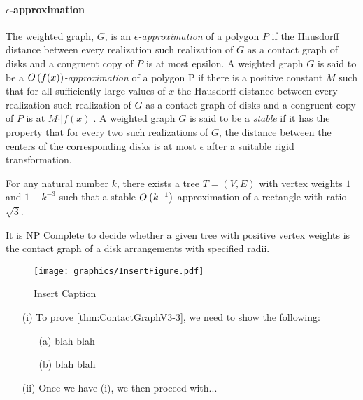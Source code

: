 \paragraph{$\epsilon$-approximation}
The weighted graph, $G$, is an \textit{$\epsilon$-approximation} of a polygon $P$ if the Hausdorff distance between every realization such realization of $G$ as a contact graph of disks and a congruent copy of $P$ is at most epsilon.  A weighted graph $G$ is said to be a \textit{$O\left( f(x) \right)$-approximation} of a polygon P if there is a positive constant $M$ such that for all sufficiently large values of $x$ the Hausdorff distance between every realization such realization of $G$ as a contact graph of disks and a congruent copy of $P$ is at $M \cdot \vert f(x)\vert$. A weighted graph $G$ is said to be a \textit{stable} if it has the property that for every two such realizations of $G$, the distance between the centers of the corresponding disks is at most $\epsilon$ after a suitable rigid transformation.  





\begin{lem}\label{lem:ContactGraphV3-1}
For any natural number $k$,  there exists a tree $T = (V,E)$ with vertex weights $1$ and $1 - k^{-3}$ such that a stable $O\left( k^{-1} \right)$-approximation of a rectangle with ratio $\sqrt{3}$.
\end{lem}
\begin{thm}\label{thm:ContactGraphV3-3}
It is NP Complete to decide whether a given tree with positive vertex weights is the contact graph of a disk arrangements with specified radii.
\end{thm}

\begin{figure}[!htbp]
\begin{center}
\texttt{[image: graphics/InsertFigure.pdf]}
\caption{Insert Caption}\label{fig:insertSomething}
\end{center}
\end{figure}

\begin{pf}
\begin{itemize}
\item[(i)]  To prove \ref{thm:ContactGraphV3-3}, we need to show the following:
	\begin{itemize}
	\item[(a)] blah blah
	\item[(b)] blah blah
	\end{itemize}
\item[(ii)] Once we have (i), we then proceed with...
\end{itemize}
\end{pf}
